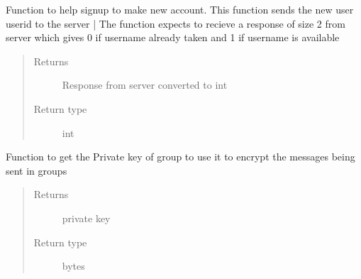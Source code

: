 \documentclass[letterpaper,10pt,english]{sphinxmanual}
\begin{document}
\begin{fulllineitems}
\begin{fulllineitems}
\label{\detokenize{Message:Message.Message._signupuid}}
Function to help signup to make new account. This function sends the new user userid to the server |
The function expects to recieve a response of size 2 from server which gives 0 if username already taken and 1 if username is available
\begin{quote}\begin{description}
\item[{Returns}] \leavevmode
Response from server converted to int

\item[{Return type}] \leavevmode
int

\end{description}\end{quote}

\end{fulllineitems}


\begin{fulllineitems}
\label{\detokenize{Message:Message.Message._create_group_key}}
Function to get the Private key of group to use it to encrypt the messages being sent in groups
\begin{quote}\begin{description}
\item[{Returns}] \leavevmode
private key

\item[{Return type}] \leavevmode
bytes

\end{description}\end{quote}

\end{fulllineitems}


\begin{fulllineitems}
\label{\detokenize{Message:Message.Message._keyex}}
\end{fulllineitems}



\end{fulllineitems}
\end{document}
